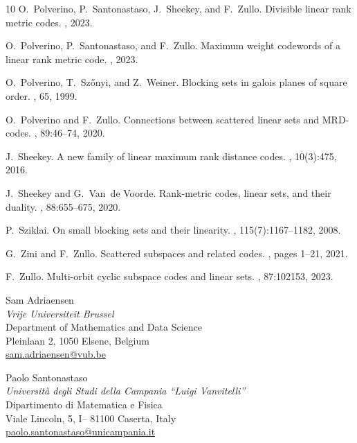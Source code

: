 \documentclass[11pt]{article}
\theoremstyle{definition}
\begin{document}
\begin{thebibliography}{10}
O.~Polverino, P.~Santonastaso, J.~Sheekey, and F.~Zullo.
\newblock Divisible linear rank metric codes.
, 2023.

O.~Polverino, P.~Santonastaso, and F.~Zullo.
\newblock Maximum weight codewords of a linear rank metric code.
, 2023.

O.~Polverino, T.~Sz\H{o}nyi, and Z.~Weiner.
\newblock Blocking sets in galois planes of square order.
, 65, 1999.

O.~Polverino and F.~Zullo.
\newblock Connections between scattered linear sets and {MRD}-codes.
, 89:46--74, 2020.

J.~Sheekey.
\newblock A new family of linear maximum rank distance codes.
, 10(3):475, 2016.

J.~Sheekey and G.~Van~de Voorde.
\newblock Rank-metric codes, linear sets, and their duality.
, 88:655--675, 2020.

P.~Sziklai.
\newblock On small blocking sets and their linearity.
, 115(7):1167--1182,
  2008.

G.~Zini and F.~Zullo.
\newblock Scattered subspaces and related codes.
, pages 1--21, 2021.

F.~Zullo.
\newblock Multi-orbit cyclic subspace codes and linear sets.
, 87:102153, 2023.

\end{thebibliography}


\bigskip

\filbreak

\noindent Sam Adriaensen \\
\textit{Vrije Universiteit Brussel} \\
Department of Mathematics and Data Science \\
Pleinlaan 2, 1050 Elsene, Belgium \\
\url{sam.adriaensen@vub.be}

\bigskip \filbreak

\noindent
Paolo Santonastaso \\
\textit{Università degli Studi della Campania ``Luigi Vanvitelli'' }\\
Dipartimento di Matematica e Fisica \\
Viale Lincoln, 5, I– 81100 Caserta, Italy \\
\url{paolo.santonastaso@unicampania.it}
\end{document}
